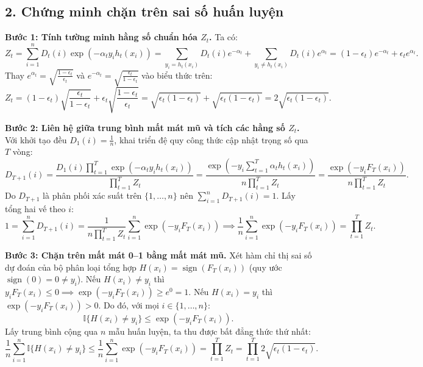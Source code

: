 \documentclass[11pt, a4paper]{article}
\begin{document}
\subsection*{2. Chứng minh chặn trên sai số huấn luyện}

\textbf{Bước 1: Tính tường minh hằng số chuẩn hóa $Z_t$.}
Ta có:
\[
Z_t = \sum_{i=1}^{n} D_t(i) \exp(-\alpha_t y_i h_t(x_i)) = \sum_{y_i = h_t(x_i)} D_t(i) e^{-\alpha_t} + \sum_{y_i \ne h_t(x_i)} D_t(i) e^{\alpha_t} = (1 - \epsilon_t)e^{-\alpha_t} + \epsilon_t e^{\alpha_t}.
\]
Thay $e^{\alpha_t} = \sqrt{\frac{1 - \epsilon_t}{\epsilon_t}}$ và $e^{-\alpha_t} = \sqrt{\frac{\epsilon_t}{1 - \epsilon_t}}$ vào biểu thức trên:
\[
Z_t = (1 - \epsilon_t)\sqrt{\frac{\epsilon_t}{1 - \epsilon_t}} + \epsilon_t\sqrt{\frac{1 - \epsilon_t}{\epsilon_t}} = \sqrt{\epsilon_t(1 - \epsilon_t)} + \sqrt{\epsilon_t(1 - \epsilon_t)} = 2\sqrt{\epsilon_t(1 - \epsilon_t)}.
\]

\textbf{Bước 2: Liên hệ giữa trung bình mất mát mũ và tích các hằng số $Z_t$.}
Với khởi tạo đều $D_1(i) = \frac{1}{n}$, khai triển đệ quy công thức cập nhật trọng số qua $T$ vòng:
\[
D_{T+1}(i) = \frac{D_1(i) \prod_{t=1}^{T} \exp(-\alpha_t y_i h_t(x_i))}{\prod_{t=1}^{T} Z_t} = \frac{\exp\left(-y_i \sum_{t=1}^{T} \alpha_t h_t(x_i)\right)}{n \prod_{t=1}^{T} Z_t} = \frac{\exp(-y_i F_T(x_i))}{n \prod_{t=1}^{T} Z_t}.
\]
Do $D_{T+1}$ là phân phối xác suất trên $\{1, \dots, n\}$ nên $\sum_{i=1}^n D_{T+1}(i) = 1$. Lấy tổng hai vế theo $i$:
\[
1 = \sum_{i=1}^{n} D_{T+1}(i) = \frac{1}{n \prod_{t=1}^{T} Z_t} \sum_{i=1}^{n} \exp(-y_i F_T(x_i)) \implies \frac{1}{n}\sum_{i=1}^{n} \exp(-y_i F_T(x_i)) = \prod_{t=1}^{T} Z_t.
\]

\textbf{Bước 3: Chặn trên mất mát 0--1 bằng mất mát mũ.}
Xét hàm chỉ thị sai số dự đoán của bộ phân loại tổng hợp $H(x_i) = \operatorname{sign}(F_T(x_i))$ (quy ước $\operatorname{sign}(0) = 0 \ne y_i$). Nếu $H(x_i) \ne y_i$ thì $y_i F_T(x_i) \le 0 \implies \exp(-y_i F_T(x_i)) \ge e^0 = 1$. Nếu $H(x_i) = y_i$ thì $\exp(-y_i F_T(x_i)) > 0$. Do đó, với mọi $i \in \{1, \dots, n\}$:
\[
\mathbb{I}\{H(x_i) \ne y_i\} \le \exp(-y_i F_T(x_i)).
\]
Lấy trung bình cộng qua $n$ mẫu huấn luyện, ta thu được bất đẳng thức thứ nhất:
\[
\frac{1}{n}\sum_{i=1}^{n} \mathbb{I}\{H(x_i) \ne y_i\} \le \frac{1}{n}\sum_{i=1}^{n} \exp(-y_i F_T(x_i)) = \prod_{t=1}^{T} Z_t = \prod_{t=1}^{T} 2\sqrt{\epsilon_t(1 - \epsilon_t)}.
\]
\end{document}

